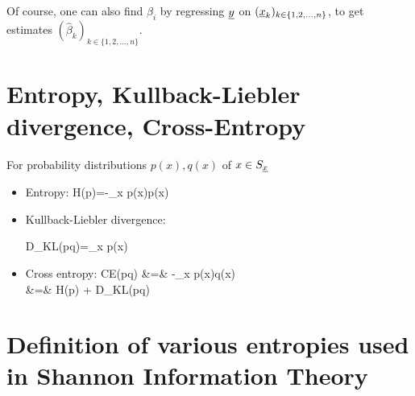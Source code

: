 Of course, one can also
find $\hat{\beta}_i$
by regressing ${\underline{y}}$
on $({\underline{x}}_k)_{k\in \{1,2, 
\ldots, n\}}$, to get
estimates 
$(\hat{\beta}_k)_{k\in \{1,2, 
\ldots, n\}}$. 


\section{Entropy,
 Kullback-Liebler divergence, Cross-Entropy}

For probability distributions $p(x), q(x)$ of $x\in S_{\underline{x}}$
\begin{itemize}
\item 
Entropy:
\beq
H(p)=-\sum_x p(x)\ln p(x)
\eeq

\item
Kullback-Liebler divergence:

\beq
D_{KL}(p\parallel q)=\sum_{x} p(x)\ln {}
\eeq
\item 
Cross entropy:
\beqa
CE(p\parallel q) &=& -\sum_x p(x)\ln q(x)\\
&=& H(p) + D_{KL}(p\parallel q)
\eeqa
\end{itemize}

\section{Definition of various
entropies used in Shannon Information Theory}


